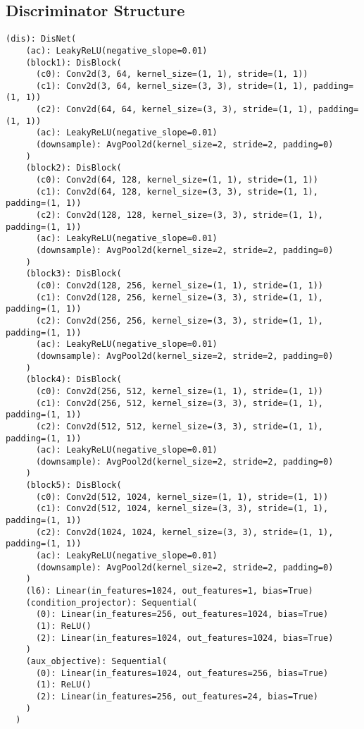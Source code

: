 \subsection{Discriminator Structure}
\begin{lstlisting}
(dis): DisNet(
    (ac): LeakyReLU(negative_slope=0.01)
    (block1): DisBlock(
      (c0): Conv2d(3, 64, kernel_size=(1, 1), stride=(1, 1))
      (c1): Conv2d(3, 64, kernel_size=(3, 3), stride=(1, 1), padding=(1, 1))
      (c2): Conv2d(64, 64, kernel_size=(3, 3), stride=(1, 1), padding=(1, 1))
      (ac): LeakyReLU(negative_slope=0.01)
      (downsample): AvgPool2d(kernel_size=2, stride=2, padding=0)
    )
    (block2): DisBlock(
      (c0): Conv2d(64, 128, kernel_size=(1, 1), stride=(1, 1))
      (c1): Conv2d(64, 128, kernel_size=(3, 3), stride=(1, 1), padding=(1, 1))
      (c2): Conv2d(128, 128, kernel_size=(3, 3), stride=(1, 1), padding=(1, 1))
      (ac): LeakyReLU(negative_slope=0.01)
      (downsample): AvgPool2d(kernel_size=2, stride=2, padding=0)
    )
    (block3): DisBlock(
      (c0): Conv2d(128, 256, kernel_size=(1, 1), stride=(1, 1))
      (c1): Conv2d(128, 256, kernel_size=(3, 3), stride=(1, 1), padding=(1, 1))
      (c2): Conv2d(256, 256, kernel_size=(3, 3), stride=(1, 1), padding=(1, 1))
      (ac): LeakyReLU(negative_slope=0.01)
      (downsample): AvgPool2d(kernel_size=2, stride=2, padding=0)
    )
    (block4): DisBlock(
      (c0): Conv2d(256, 512, kernel_size=(1, 1), stride=(1, 1))
      (c1): Conv2d(256, 512, kernel_size=(3, 3), stride=(1, 1), padding=(1, 1))
      (c2): Conv2d(512, 512, kernel_size=(3, 3), stride=(1, 1), padding=(1, 1))
      (ac): LeakyReLU(negative_slope=0.01)
      (downsample): AvgPool2d(kernel_size=2, stride=2, padding=0)
    )
    (block5): DisBlock(
      (c0): Conv2d(512, 1024, kernel_size=(1, 1), stride=(1, 1))
      (c1): Conv2d(512, 1024, kernel_size=(3, 3), stride=(1, 1), padding=(1, 1))
      (c2): Conv2d(1024, 1024, kernel_size=(3, 3), stride=(1, 1), padding=(1, 1))
      (ac): LeakyReLU(negative_slope=0.01)
      (downsample): AvgPool2d(kernel_size=2, stride=2, padding=0)
    )
    (l6): Linear(in_features=1024, out_features=1, bias=True)
    (condition_projector): Sequential(
      (0): Linear(in_features=256, out_features=1024, bias=True)
      (1): ReLU()
      (2): Linear(in_features=1024, out_features=1024, bias=True)
    )
    (aux_objective): Sequential(
      (0): Linear(in_features=1024, out_features=256, bias=True)
      (1): ReLU()
      (2): Linear(in_features=256, out_features=24, bias=True)
    )
  )
\end{lstlisting}
